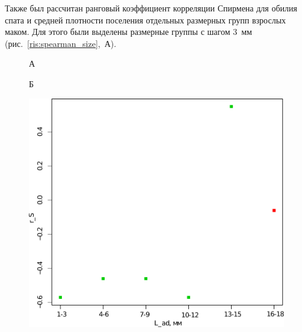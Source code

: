Также был рассчитан ранговый коэффициент корреляции Спирмена для обилия спата и средней плотности поселения отдельных размерных групп взрослых маком. 
Для этого были выделены размерные группы с шагом $3$~мм (рис.~\ref{ris:spearman_size},~А).
	\begin{figure}[p]
	\begin{minipage}[b]{.46\linewidth}
	\begin{center}
	А
	\end{center}
	\end{minipage}
	\hfil %
	\begin{minipage}[b]{.46\linewidth}
	\begin{center}
	Б
	\end{center}
	\end{minipage}
	\begin{minipage}[b]{.46\linewidth}
	\begin{center}
		\includegraphics[width=\textwidth]{../White_Sea/spat/spearman_spat_3mm_1.pdf}
	\end{center}
	\end{minipage}
%
	\hfil %
	\begin{minipage}[b]{.46\linewidth}

\end{minipage}
\end{figure}
